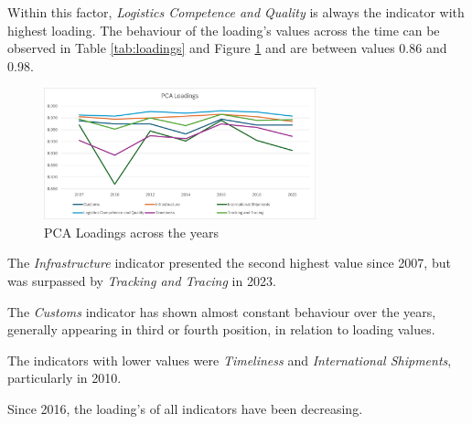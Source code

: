 \documentclass[conference]{IEEEtran}
\begin{document}
Within this factor,  \textit{Logistics Competence and Quality} is always the indicator with highest loading. The behaviour of the loading's values across the time can be observed in Table \ref{tab:loadings} and Figure \ref{fig:PCAl} and are between values 0.86 and 0.98.

\begin{figure}
    \centering
    \includegraphics[width=0.7\textwidth]{Loadings.jpg}
    \caption{PCA Loadings across the years}
    \label{fig:PCAl}
\end{figure}

The \textit{Infrastructure} indicator presented the second highest value since 2007, but was surpassed by \textit{Tracking and Tracing} in 2023.

The \textit{Customs} indicator has shown almost constant behaviour over the years, generally appearing in third or fourth position, in relation to loading values.

The indicators with lower values were \textit{Timeliness} and \textit{International Shipments}, particularly in 2010.

Since 2016, the loading's of all indicators have been decreasing.

%
\end{document}
